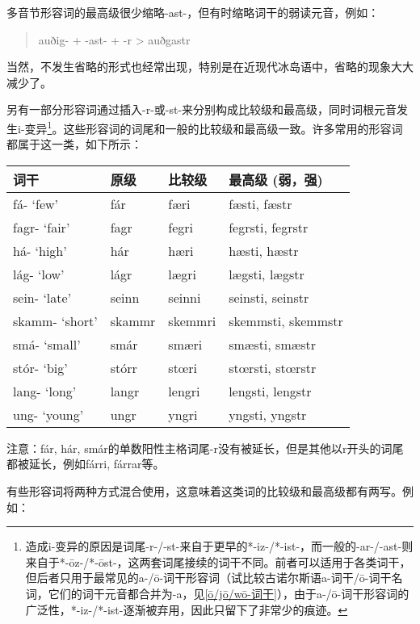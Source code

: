 多音节形容词的最高级很少缩略-ast-，但有时缩略词干的弱读元音，例如：

\begin{quote}
    auðig- + -ast- + -r > auðgastr
\end{quote}

当然，不发生省略的形式也经常出现，特别是在近现代冰岛语中，省略的现象大大减少了。

另有一部分形容词通过插入-r-或-st-来分别构成比较级和最高级，同时词根元音发生i-变异\footnote{造成i-变异的原因是词尾-r-/-st-来自于更早的*-iz-/*-ist-，而一般的-ar-/-ast-则来自于*-ōz-/*-ōst-，这两套词尾接续的词干不同。前者可以适用于各类词干，但后者只用于最常见的a-/ō-词干形容词（试比较古诺尔斯语a-词干/ō-词干名词，它们的词干元音都合并为-a，见\ref{ō/jō/wō-词干}），由于a-/ō-词干形容词的广泛性，*-iz-/*-ist-逐渐被弃用，因此只留下了非常少的痕迹。}。这些形容词的词尾和一般的比较级和最高级一致。许多常用的形容词都属于这一类，如下所示：

\begin{longtable}{llll}
    \toprule
    词干           & 原级   & 比较级  & 最高级 (弱，强)     \\
    \midrule
    \endhead
    \bottomrule
    \endfoot
    fá- `few‌'      & fár    & færi    & fæsti, fæstr       \\
    fagr- `fair‌'   & fagr   & fegri   & fegrsti, fegrstr   \\
    há- `high‌'     & hár    & hæri    & hæsti, hæstr       \\
    lág- `low‌'     & lágr   & lægri   & lægsti, lægstr     \\
    sein- `late‌'   & seinn  & seinni  & seinsti, seinstr   \\
    skamm- `short‌' & skammr & skemmri & skemmsti, skemmstr \\
    smá- `small‌'   & smár   & smæri   & smæsti, smæstr     \\
    stór- `big‌'    & stórr  & stœri   & stœrsti, stœrstr   \\
    lang- `long‌'   & langr  & lengri  & lengsti, lengstr   \\
    ung- `young‌'   & ungr   & yngri   & yngsti, yngstr     \\
\end{longtable}

注意：fár, hár, smár的单数阳性主格词尾-r没有被延长，但是其他以r开头的词尾都被延长，例如fárri, fárrar等。

有些形容词将两种方式混合使用，这意味着这类词的比较级和最高级都有两写。例如：

